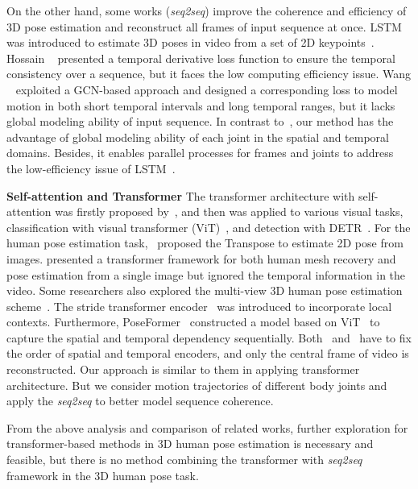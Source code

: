 \documentclass[10pt,twocolumn,letterpaper]{article}
\begin{document}
On the other hand, some works (\textit{seq2seq}) improve the coherence and efficiency of 3D pose estimation and reconstruct all frames of input sequence at once.
	LSTM~\cite{lstm} was introduced to estimate 3D poses in video from a set of 2D keypoints~\cite{recurrent_pose_machine}. 
	Hossain \etal~\cite{temporalconsis} presented a temporal derivative loss function to ensure the temporal consistency over a sequence, but it faces the low computing efficiency issue.
	Wang \etal~\cite{motionguidepose} exploited a GCN-based approach and designed a corresponding loss to model motion in both short temporal intervals and long temporal ranges, but it lacks global modeling ability of input sequence.
	In contrast to~\cite{motionguidepose,temporalconsis}, our method has the advantage of global modeling ability of each joint in the spatial and temporal domains.
	Besides, it enables parallel processes for frames and joints to address the low-efficiency issue of LSTM~\cite{lstm}.


	\textbf{Self-attention and Transformer}
	The transformer architecture with self-attention was firstly proposed by~\cite{attisalluneed}, and then was applied to various visual tasks, \eg classification with visual transformer (ViT)~\cite{vit}, and detection with DETR~\cite{detr}.
	For the human pose estimation task,~\cite{yang2020transpose} proposed the Transpose to estimate 2D pose from images. 
	\cite{metro} presented a transformer framework for both human mesh recovery and pose estimation from a single image but ignored the temporal information in the video. 
	Some researchers also explored the multi-view 3D human pose estimation scheme~\cite{epipolar_transformer}.
	The stride transformer encoder~\cite{liftformer} was introduced to incorporate local contexts.
	Furthermore, PoseFormer~\cite{poseformer} constructed a model based on ViT~\cite{vit} to capture the spatial and temporal dependency sequentially.
	Both~\cite{liftformer} and~\cite{poseformer} have to fix the order of spatial and temporal encoders, and only the central frame of video is reconstructed.
Our approach is similar to them in applying transformer architecture. 
	But we consider motion trajectories of different body joints and apply the \textit{seq2seq} to better model sequence coherence.


	From the above analysis and comparison of related works, further exploration for transformer-based methods in 3D human pose estimation is necessary and feasible, but there is no method combining the transformer with \textit{seq2seq} framework in the 3D human pose task.
	
\end{document}

